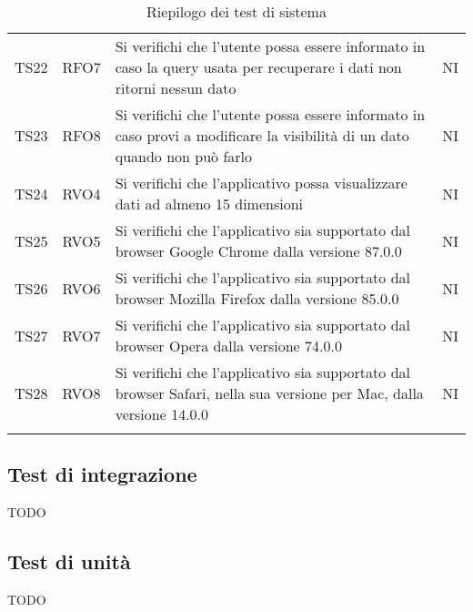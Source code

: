 \documentclass[../piano_di_qualifica.tex]{subfiles}
\begin{document}
\begin{center}
\begin{longtable}{|c|c|p{8cm}|c|}
		TS22              & RFO7                   & Si verifichi che l'utente possa essere informato in caso la query usata per recuperare i dati non ritorni nessun dato     & NI                         \\
		TS23              & RFO8                   & Si verifichi che l'utente possa essere informato in caso provi a modificare la visibilità di un dato quando non può farlo & NI                         \\
		TS24              & RVO4                   & Si verifichi che l'applicativo possa visualizzare dati ad almeno 15 dimensioni                                            & NI                         \\
		TS25              & RVO5                   & Si verifichi che l'applicativo sia supportato dal browser Google Chrome dalla versione 87.0.0                             & NI                         \\
		TS26              & RVO6                   & Si verifichi che l'applicativo sia supportato dal browser Mozilla Firefox dalla versione 85.0.0                           & NI                         \\
		TS27              & RVO7                   & Si verifichi che l'applicativo sia supportato dal browser Opera dalla versione 74.0.0                                     & NI                         \\
		TS28              & RVO8                   & Si verifichi che l'applicativo sia supportato dal browser Safari, nella sua versione per Mac, dalla versione 14.0.0       & NI                         \\
		\hline
		\rowcolor{white}
		\caption{Riepilogo dei test di sistema}
	\end{longtable}
\end{center}

\subsection{Test di integrazione}%
\label{sub:test_int}

TODO

\subsection{Test di unità}%
\label{sub:test_unit}

TODO
\end{document}

